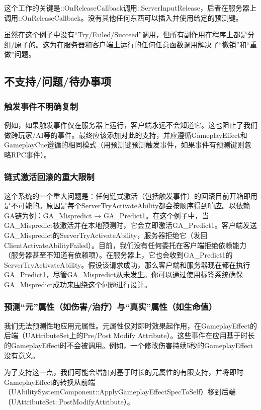 \documentclass[10pt,CJKmath]{ctexart}
\begin{document}
这个工作的关键是::OnReleaseCallback调用::ServerInputRelease，后者在服务器上调用::OnReleaseCallback。没有其他任何东西可以插入并使用给定的预测键。

虽然在这个例子中没有“Try/Failed/Succeed”调用，但所有副作用在程序上都是分组/原子的。这为在服务器和客户端上运行的任何任意函数调用解决了“撤销”和“重做”问题。

\subsection{不支持/问题/待办事项}

\subsubsection{触发事件不明确复制}
例如，如果触发事件仅在服务器上运行，客户端永远不会知道它。这也阻止了我们做跨玩家/AI等的事件。最终应该添加对此的支持，并应遵循GameplayEffect和GameplayCue遵循的相同模式（用预测键预测触发事件，如果事件有预测键则忽略RPC事件）。

\subsubsection{链式激活回滚的重大限制}
这个系统的一个重大问题是：任何链式激活（包括触发事件）的回滚目前开箱即用是不可能的。原因是每个ServerTryActivateAbility都会按顺序得到响应。以依赖GA链为例：GA\_Mispredict → GA\_Predict1。在这个例子中，当GA\_Mispredict被激活并在本地预测时，它会立即激活GA\_Predict1。客户端发送GA\_Mispredict的ServerTryActivateAbility，服务器拒绝它（发回ClientActivateAbilityFailed）。目前，我们没有任何委托在客户端拒绝依赖能力（服务器甚至不知道有依赖项）。在服务器上，它也会收到GA\_Predict1的ServerTryActivateAbility。假设该请求成功，那么客户端和服务器现在都在执行GA\_Predict1，尽管GA\_Mispredict从未发生。你可以通过使用标签系统确保GA\_Mispredict成功来围绕这个问题进行设计。

\subsubsection{预测“元”属性（如伤害/治疗）与“真实”属性（如生命值）}
我们无法预测性地应用元属性。元属性仅对即时效果起作用，在GameplayEffect的后端（UAttributeSet上的Pre/Post Modify Attribute）。这些事件在应用基于时长的GameplayEffect时不会被调用。例如，一个修改伤害持续5秒的GameplayEffect没有意义。

为了支持这一点，我们可能会增加对基于时长的元属性的有限支持，并将即时GameplayEffect的转换从前端（UAbilitySystemComponent::ApplyGameplayEffectSpecToSelf）移到后端（UAttributeSet::PostModifyAttribute）。
\end{document}
